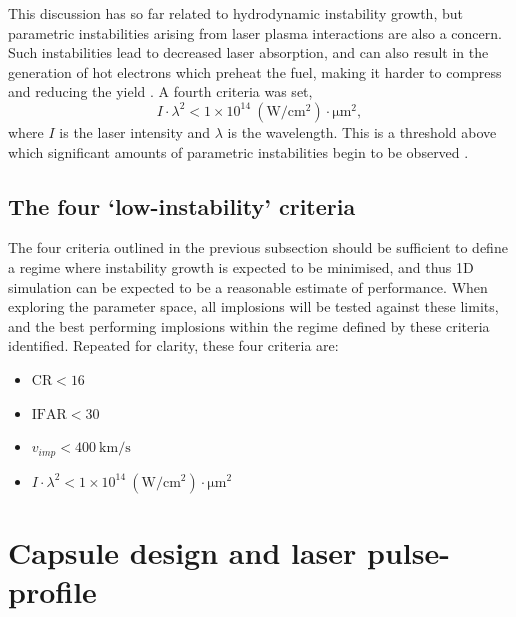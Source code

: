 This discussion has so far related to hydrodynamic instability growth, but parametric instabilities arising from laser plasma interactions are also a concern. Such instabilities lead to decreased laser absorption, and can also result in the generation of hot electrons which preheat the fuel, making it harder to compress and reducing the yield \cite{Rosenberg2018, Yaakobi2000}. A fourth criteria was set,
\begin{equation} I \cdot \lambda^2 < 1 \times 10^{14} \: (\unit{\watt\per\centi\meter\squared}) \cdot \unit{\micro\meter\squared}, \end{equation}
where $I$ is the laser intensity and $\lambda$ is the wavelength. This is a threshold above which significant amounts of parametric instabilities begin to be observed \cite{Montgomery2016}.

\subsection{The four `low-instability' criteria}
The four criteria outlined in the previous subsection should be sufficient to define a regime where instability growth is expected to be minimised, and thus 1D simulation can be expected to be a reasonable estimate of performance. When exploring the parameter space, all implosions will be tested against these limits, and the best performing implosions within the regime defined by these criteria identified. Repeated for clarity, these four criteria are:
\begin{itemize}
    \item $\textrm{CR} < 16$
    \item $\textrm{IFAR} < 30$
    \item $v_{imp} < 400 \: \unit{\kilo\meter\per\second}$
    \item $I \cdot \lambda^2 < 1 \times 10^{14} \: (\unit{\watt\per\centi\meter\squared}) \cdot \unit{\micro\meter\squared}$
\end{itemize}



\section{Capsule design and laser pulse-profile} \label{sec: CapsuleAndPulse}

